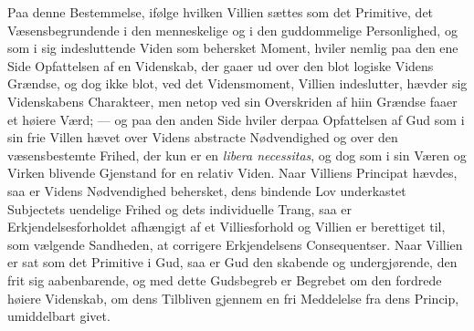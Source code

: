 \documentclass[12pt,a4paper]{book}
\newcommand{\opage}[1]{\marginnote{\footnotesize\textit{[#1]}}}
\begin{document}
Paa denne Bestemmelse, ifølge hvilken Villien sættes som det Primitive, det
Væsensbegrundende i den menneskelige og i den guddommelige Personlighed, og som i
sig indesluttende Viden som behersket Moment, hviler nemlig paa den ene Side
Opfattelsen af en Videnskab, der gaaer ud over den blot logiske Videns Grændse, og
dog ikke blot, ved det Vidensmoment, Villien indeslutter, hævder sig Videnskabens
Charakteer, men netop ved sin Overskriden af hiin Grændse faaer et høiere Værd;
--- og paa den anden Side hviler derpaa Opfattelsen af Gud som i sin frie Villen
hævet over Videns abstracte Nødvendighed og over den væsensbestemte Frihed, der
kun er en \textit{libera necessitas}, og dog som i sin Væren og Virken blivende
Gjenstand for en relativ Viden. Naar Villiens Principat hævdes, saa er \opage{50}Videns
Nødvendighed behersket, dens bindende Lov underkastet Subjectets uendelige Frihed
og dets individuelle Trang, saa er Erkjendelsesforholdet afhængigt af et
Villiesforhold og Villien er berettiget til, som vælgende Sandheden, at corrigere
Erkjendelsens Consequentser. Naar Villien er sat som det Primitive i Gud, saa er
Gud den skabende og undergjørende, den frit sig aabenbarende, og med dette
Gudsbegreb er Begrebet om den fordrede høiere Videnskab, om dens Tilbliven gjennem
en fri Meddelelse fra dens Princip, umiddelbart givet.
\end{document}
